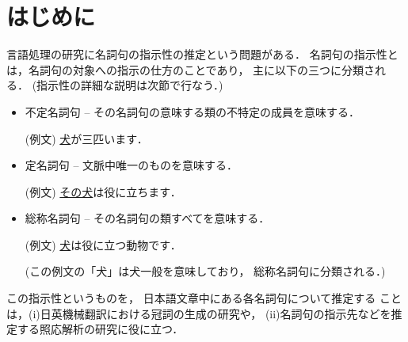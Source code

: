 

\maketitle


\section{はじめに}\label{intro}

言語処理の研究に名詞句の指示性の推定という問題がある\cite{murata_ref_nlp}．
名詞句の指示性とは，名詞句の対象への指示の仕方のことであり，
主に以下の三つに分類される．
(指示性の詳細な説明は次節で行なう．)
\begin{itemize}
\item 
  不定名詞句 -- その名詞句の意味する類の不特定の成員を意味する．

  (例文) \underline{犬}が三匹います．
\item 
  定名詞句 -- 文脈中唯一のものを意味する．

  (例文) \underline{その犬}は役に立ちます．
\item 
  総称名詞句 -- その名詞句の類すべてを意味する．

  (例文) \underline{犬}は役に立つ動物です．

  (この例文の「犬」は犬一般を意味しており，
  総称名詞句に分類される．)
\end{itemize}


この指示性というものを，
日本語文章中にある各名詞句について推定する
ことは，(i)日英機械翻訳における冠詞の生成の研究や，
(ii)名詞句の指示先などを推定する照応解析の研究に役に立つ．


